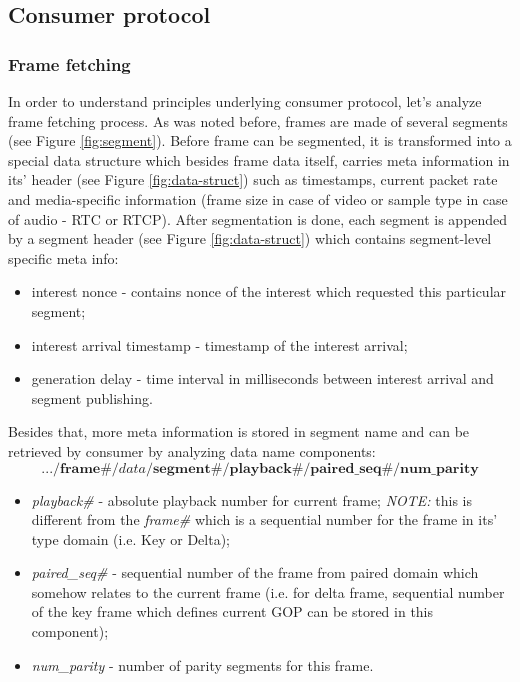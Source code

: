 \documentclass[10pt]{proc}
\begin{document}
\subsection{Consumer protocol}

\subsubsection{Frame fetching}

In order to understand principles underlying consumer protocol, let's analyze frame fetching process. As was noted before, frames are made of several segments (see Figure \ref{fig:segment}). Before frame can be segmented, it is transformed into a special data structure which besides frame data itself, carries meta information in its' header (see Figure \ref{fig:data-struct}) such as timestamps, current packet rate and media-specific information (frame size in case of video or sample type in case of audio - RTC or RTCP). After segmentation is done, each segment is appended by a segment header (see Figure \ref{fig:data-struct}) which contains segment-level specific meta info: 
\begin{itemize}
\item interest nonce - contains nonce of the interest which requested this particular segment;
\item interest arrival timestamp - timestamp of the interest arrival;
\item generation delay - time interval in milliseconds between interest arrival and segment publishing.
\end{itemize}
Besides that, more meta information is stored in segment name and can be retrieved by consumer by analyzing data name components:
\tiny\begin{equation}
.../\textbf{frame\#}/data/\textbf{segment\#}/\textbf{playback\#}/\textbf{paired\_seq\#}/\textbf{num\_parity} \nonumber
\end{equation}\normalsize
\begin{itemize}
\item \textit{playback\#} - absolute playback number for current frame; \textit{NOTE:} this is different from the \textit{frame\#} which is a sequential number for the frame in its' type domain (i.e. Key or Delta);
\item \textit{paired\_seq\#} - sequential number of the frame from paired domain which somehow relates to the current frame (i.e. for delta frame, sequential number of the key frame which defines current GOP can be stored in this component);
\item \textit{num\_parity} - number of parity segments for this frame.
\end{itemize}
\end{document}
